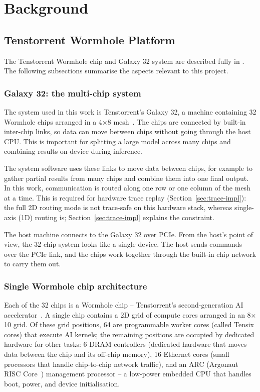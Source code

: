 \section{Background}

\subsection{Tenstorrent Wormhole Platform}
\label{sec:arch}

The Tenstorrent Wormhole chip and Galaxy 32 system are described fully in \citep{tenstorrent_wormhole,tenstorrent_galaxy}. The following subsections summarise the aspects relevant to this project.

\subsubsection{Galaxy 32: the multi-chip system}

The system used in this work is Tenstorrent's Galaxy 32, a machine containing 32 Wormhole chips arranged in a 4$\times$8 mesh~\citep{tenstorrent_galaxy}. The chips are connected by built-in inter-chip links, so data can move between chips without going through the host CPU. This is important for splitting a large model across many chips and combining results on-device during inference.

The system software uses these links to move data between chips, for example to gather partial results from many chips and combine them into one final output. In this work, communication is routed along one row or one column of the mesh at a time. This is required for hardware trace replay (Section~\ref{sec:trace-impl}): the full 2D routing mode is not trace-safe on this hardware stack, whereas single-axis (1D) routing is; Section~\ref{sec:trace-impl} explains the constraint.

The host machine connects to the Galaxy 32 over PCIe. From the host's point of view, the 32-chip system looks like a single device. The host sends commands over the PCIe link, and the chips work together through the built-in chip network to carry them out.

\subsubsection{Single Wormhole chip architecture}

Each of the 32 chips is a Wormhole chip -- Tenstorrent's second-generation AI accelerator~\citep{tenstorrent_wormhole}. A single chip contains a 2D grid of compute cores arranged in an 8$\times$10 grid. Of these grid positions, 64 are programmable worker cores (called Tensix cores) that execute AI kernels; the remaining positions are occupied by dedicated hardware for other tasks: 6 DRAM controllers (dedicated hardware that moves data between the chip and its off-chip memory), 16 Ethernet cores (small processors that handle chip-to-chip network traffic), and an ARC (Argonaut RISC Core~\citep{mips_arc}) management processor -- a low-power embedded CPU that handles boot, power, and device initialisation.

